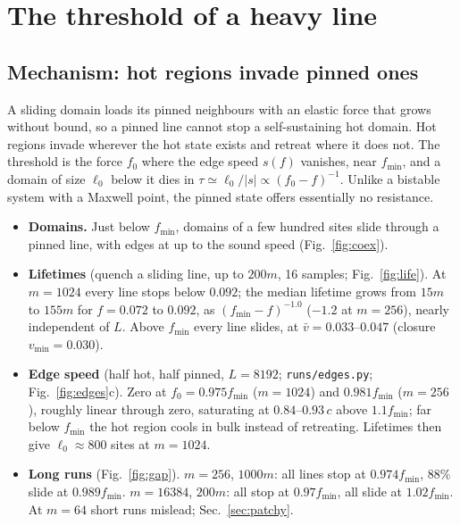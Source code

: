 \documentclass[10pt,a4paper]{article}
\begin{document}
\section{The threshold of a heavy line}
\label{sec:threshold}

\subsection{Mechanism: hot regions invade pinned ones}
\label{sec:invasion}

A sliding domain loads its pinned neighbours with an elastic force that grows without bound, so a pinned line cannot stop a self-sustaining hot domain. Hot regions invade wherever the hot state exists and retreat where it does not. The threshold is the force $f_0$ where the edge speed $s(f)$ vanishes, near $f_{\min}$, and a domain of size $\ell_0$ below it dies in $\tau\simeq\ell_0/|s|\propto(f_0-f)^{-1}$. Unlike a bistable system with a Maxwell point, the pinned state offers essentially no resistance.

\begin{itemize}
\item \textbf{Domains.} Just below $f_{\min}$, domains of a few hundred sites slide through a pinned line, with edges at up to the sound speed (Fig.~\ref{fig:coex}).
\item \textbf{Lifetimes} (quench a sliding line, up to $200m$, 16 samples; Fig.~\ref{fig:life}). At $m=1024$ every line stops below $0.092$; the median lifetime grows from $15m$ to $155m$ for $f=0.072$ to $0.092$, as $(f_{\min}-f)^{-1.0}$ ($-1.2$ at $m=256$), nearly independent of $L$. Above $f_{\min}$ every line slides, at $\bar v=0.033$--$0.047$ (closure $v_{\min}=0.030$).
\item \textbf{Edge speed} (half hot, half pinned, $L=8192$; \texttt{runs/edges.py}; Fig.~\ref{fig:edges}c). Zero at $f_0=0.975f_{\min}$ ($m=1024$) and $0.981f_{\min}$ ($m=256$), roughly linear through zero, saturating at $0.84$--$0.93\,c$ above $1.1f_{\min}$; far below $f_{\min}$ the hot region cools in bulk instead of retreating. Lifetimes then give $\ell_0\approx800$ sites at $m=1024$.
\item \textbf{Long runs} (Fig.~\ref{fig:gap}). $m=256$, $1000m$: all lines stop at $0.974f_{\min}$, 88\% slide at $0.989f_{\min}$. $m=16384$, $200m$: all stop at $0.97f_{\min}$, all slide at $1.02f_{\min}$. At $m=64$ short runs mislead; Sec.~\ref{sec:patchy}.
\end{itemize}
\end{document}
